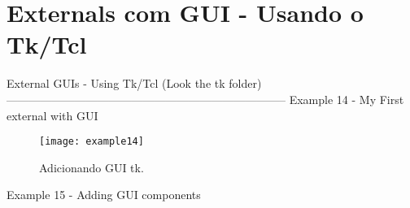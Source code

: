 
\chapter{Externals com GUI - Usando o Tk/Tcl}
External GUIs - Using Tk/Tcl (Look the tk folder)
--------------------------------------------------------------------------
Example 14 - My First external with GUI
\begin{figure}[h!]
	\centering
	\texttt{[image: example14]}
	\caption{Adicionando GUI tk.}
\end{figure}

Example 15 - Adding GUI components

